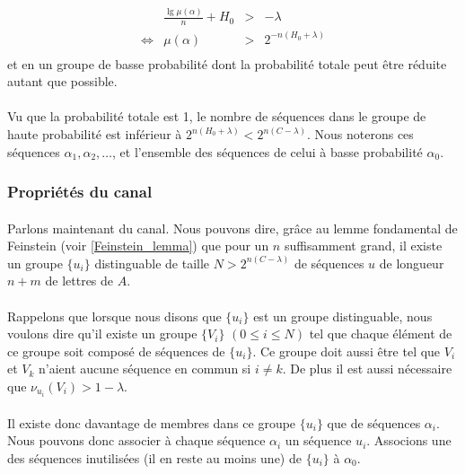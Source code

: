 	\[
		\begin{array}{crcl}
			&\frac{\lg \mu\left(\alpha\right)}{n}+H_0 &>& -\lambda\\
			\Leftrightarrow & \mu(\alpha) & > &2^{-n\left(H_0+\lambda\right)}\\
		\end{array}
	\]
	et en un groupe de basse probabilité dont la probabilité totale peut être 
	réduite autant que possible.

	\paragraph{}
	Vu que la probabilité totale est 1, le nombre de séquences dans le groupe
	de haute probabilité est inférieur à $2^{n(H_0+\lambda)}<2^{n(C-\lambda)}$.
	Nous noterons ces séquences $\alpha_1,\alpha_2,\dots$, et l'ensemble des
	séquences de celui à basse probabilité $\alpha_0$.
	
\subsubsection*{Propriétés du canal}
	
	\paragraph{}
	Parlons maintenant du canal. Nous pouvons dire, grâce au lemme fondamental
	de Feinstein (voir \ref{Feinstein_lemma}) que pour un $n$ suffisamment
	grand, il existe un groupe $\{u_i\}$ distinguable de taille 
	$N > 2^{n(C-\lambda)}$ de séquences $u$ de longueur $n+m$ de lettres 
	de $A$.
	
	\paragraph{}
	Rappelons que lorsque nous disons que $\{u_i\}$ est un groupe distinguable,
	nous voulons dire qu'il existe un groupe $\{V_i\}$ $(0 \le i \le N)$ 
	tel que chaque élément de ce groupe soit composé de séquences de $\{u_i\}$.
	Ce groupe doit aussi être tel que $ V_i$ et $V_k$ n'aient aucune séquence
	en commun si $i\neq k$. De plus il est aussi nécessaire que
	$\nu_{u_i}(V_i) > 1-\lambda$. 
	
	\paragraph{}
	Il existe donc davantage de membres dans ce groupe $\{u_i\}$ que de 
	séquences $\alpha_i$. Nous pouvons donc associer à chaque séquence 
	$\alpha_i$ un séquence $u_i$. Associons une des séquences inutilisées 
	(il en reste au moins une) de $\{u_i\}$ à $\alpha_0$.
	
